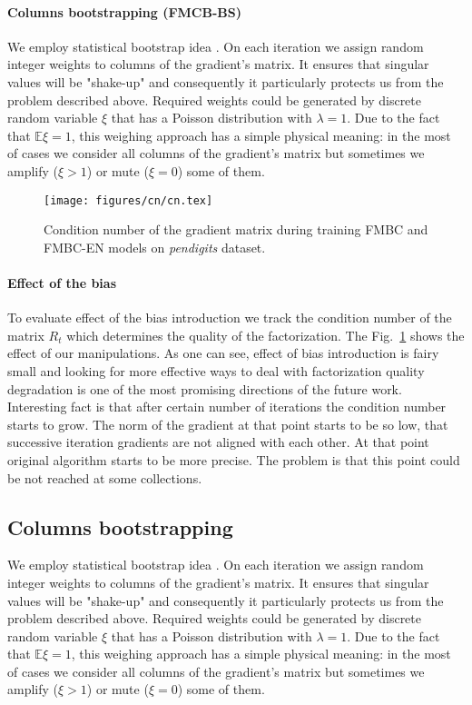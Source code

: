 \documentclass{article}
\begin{document}
\paragraph{Columns bootstrapping (FMCB-BS)}
We employ statistical bootstrap idea \cite{Efron1992bootstrap}. On each iteration we assign random integer weights to columns of the gradient's matrix. It ensures that singular values will be "shake-up" and consequently it particularly protects us from the problem described above. Required weights could be generated by discrete random variable $\xi$ that has a Poisson distribution with $\lambda = 1$. Due to the fact that $\mathbb{E} \xi = 1$, this weighing approach has a simple physical meaning: in the most of cases we consider all columns of the gradient's matrix but sometimes we amplify ($\xi > 1$) or mute ($\xi = 0$) some of them.

\begin{figure}
\vskip 0.2in
\begin{center}
\centerline{\texttt{[image: figures/cn/cn.tex]}}
\caption{Condition number of the gradient matrix during training FMBC and FMBC-EN models on \emph{pendigits} dataset.}
\end{center}
\label{fig:condition_number}
\vskip -0.2in
\end{figure}

\paragraph{Effect of the bias}
To evaluate effect of the bias introduction we track the condition number of the matrix $R_t$ which determines the quality of the factorization. The Fig.~\ref{fig:condition_number} shows the effect of our manipulations. As one can see, effect of bias introduction is fairy small and looking for more effective ways to deal with factorization quality degradation is one of the most promising directions of the future work. Interesting fact is that after certain number of iterations the condition number starts to grow. The norm of the gradient at that point starts to be so low, that successive iteration gradients are not aligned with each other. At that point original algorithm starts to be more precise. The problem is that this point could be not reached at some collections.

\subsection{Columns bootstrapping}
We employ statistical bootstrap idea \cite{Efron1992bootstrap}. On each iteration we assign random integer weights to columns of the gradient's matrix. It ensures that singular values will be "shake-up" and consequently it particularly protects us from the problem described above. Required weights could be generated by discrete random variable $\xi$ that has a Poisson distribution with $\lambda = 1$. Due to the fact that $\mathbb{E} \xi = 1$, this weighing approach has a simple physical meaning: in the most of cases we consider all columns of the gradient's matrix but sometimes we amplify ($\xi > 1$) or mute ($\xi = 0$) some of them.
\end{document}
